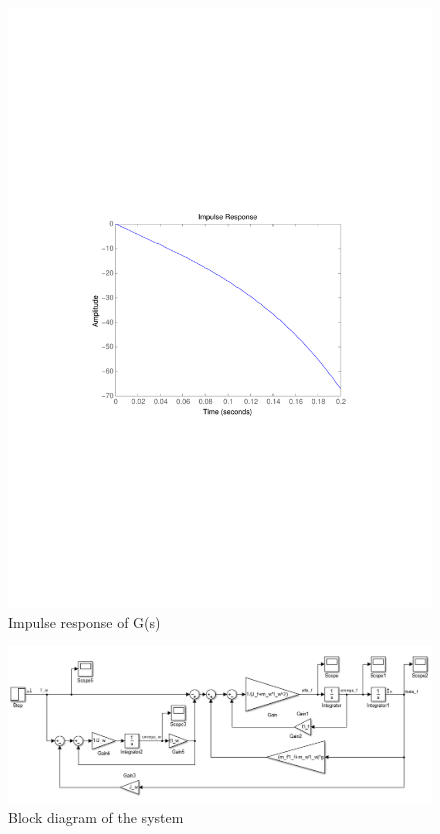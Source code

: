 \begin{figure}[H] 
	\centering 
	\includegraphics[scale=0.8]{figures/impulseResponseTF}
	\centering
	\captionsetup{justification=centering}	
	\caption{Impulse response of G(s)}
	\label{impulseCubliTF}
\end{figure}

\begin{figure}[H] 
	\centering 
	\includegraphics[scale=0.5]{figures/cubliSimulink}
	\centering
	\captionsetup{justification=centering}
	\caption{Block diagram of the system}
	\label{cubliSimulink}
\end{figure} 

